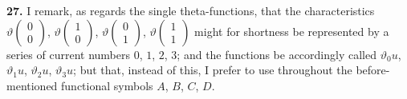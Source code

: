 \documentclass[11pt,a4paper]{book}
\begin{document}
\vspace{0.5em}

\noindent\textbf{27.}\quad
I remark, as regards the single theta-functions, that the characteristics $\vartheta\begin{pmatrix} 0 \\ 0 \end{pmatrix}$, $\vartheta\begin{pmatrix} 1 \\ 0 \end{pmatrix}$, $\vartheta\begin{pmatrix} 0 \\ 1 \end{pmatrix}$, $\vartheta\begin{pmatrix} 1 \\ 1 \end{pmatrix}$ might for shortness be represented by a series of current numbers $0$, $1$, $2$, $3$; and the functions be accordingly called $\vartheta_0 u$, $\vartheta_1 u$, $\vartheta_2 u$, $\vartheta_3 u$; but that, instead of this, I prefer to use throughout the before-mentioned functional symbols $A$, $B$, $C$, $D$.
\end{document}
